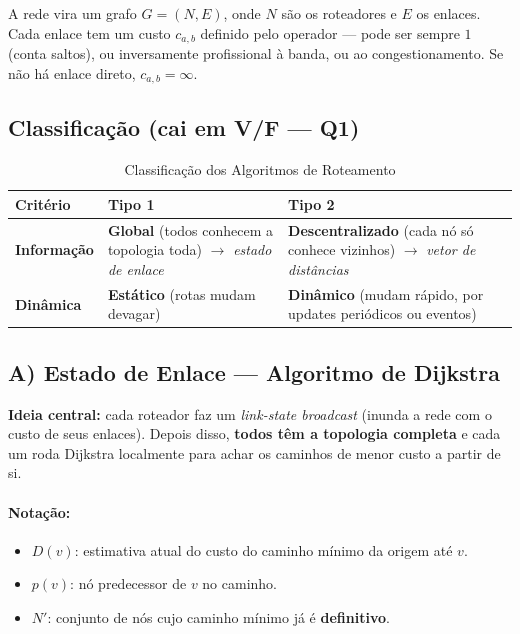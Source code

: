 \documentclass[11pt,a4paper]{article}
\begin{document}
A rede vira um grafo $G = (N, E)$, onde $N$ são os roteadores e $E$ os enlaces. Cada enlace tem um custo $c_{a,b}$ definido pelo operador --- pode ser sempre $1$ (conta saltos), ou inversamente profissional à banda, ou ao congestionamento. Se não há enlace direto, $c_{a,b} = \infty$.

\subsection{Classificação (cai em V/F --- Q1)}

\begin{table}[h!]
\centering
\caption{Classificação dos Algoritmos de Roteamento}
\label{tab:classificacao}
\begin{tabularx}{\textwidth}{lXX}
\toprule
\textbf{Critério} & \textbf{Tipo 1} & \textbf{Tipo 2} \\
\midrule
\textbf{Informação} & \textbf{Global} (todos conhecem a topologia toda) $\to$ \emph{estado de enlace} & \textbf{Descentralizado} (cada nó só conhece vizinhos) $\to$ \emph{vetor de distâncias} \\
\textbf{Dinâmica} & \textbf{Estático} (rotas mudam devagar) & \textbf{Dinâmico} (mudam rápido, por updates periódicos ou eventos) \\
\bottomrule
\end{tabularx}
\end{table}

\hrulefill

\subsection{A) Estado de Enlace --- Algoritmo de Dijkstra}

\textbf{Ideia central:} cada roteador faz um \textit{link-state broadcast} (inunda a rede com o custo de seus enlaces). Depois disso, \textbf{todos têm a topologia completa} e cada um roda Dijkstra localmente para achar os caminhos de menor custo a partir de si.

\paragraph{Notação:}
\begin{itemize}
    \item $D(v)$: estimativa atual do custo do caminho mínimo da origem até $v$.
    \item $p(v)$: nó predecessor de $v$ no caminho.
    \item $N'$: conjunto de nós cujo caminho mínimo já é \textbf{definitivo}.
\end{itemize}
\end{document}
